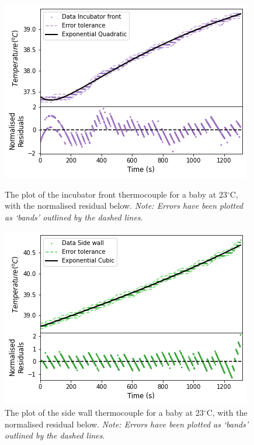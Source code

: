 \documentclass{article}
\begin{document}
\begin{figure}[H]
\centering
\begin{minipage}{.48\linewidth}
    \captionsetup{justification=centering,margin=0.3cm}
    \includegraphics[width=\linewidth]{Incubator front 23C.png}
    \caption{The plot of the incubator front thermocouple for a baby at 23$^{\circ}$C, with the normalised residual below. \textit{Note: Errors have been plotted as ‘bands’ outlined by the dashed lines}.}
    \label{23C FRONT}
\end{minipage}
\hfill
\begin{minipage}{.48\linewidth}
    \captionsetup{justification=centering,margin=0.3 cm}
    \includegraphics[width=\linewidth]{Side wall 23C.png}
    \caption{The plot of the side wall thermocouple for a baby at 23$^{\circ}$C, with the normalised residual below. \textit{Note: Errors have been plotted as ‘bands’ outlined by the dashed lines}.}
    \label{23C SW}
    \end{minipage}
\end{figure}
\end{document}
